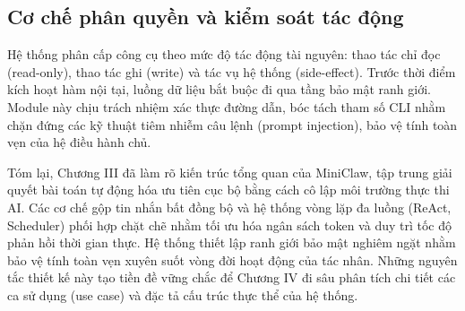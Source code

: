 \subsection{Cơ chế phân quyền và kiểm soát tác động}
Hệ thống phân cấp công cụ theo mức độ tác động tài nguyên: thao tác chỉ đọc (read-only), thao tác ghi (write) và tác vụ hệ thống (side-effect). Trước thời điểm kích hoạt hàm nội tại, luồng dữ liệu bắt buộc đi qua tầng bảo mật ranh giới. Module này chịu trách nhiệm xác thực đường dẫn, bóc tách tham số CLI nhằm chặn đứng các kỹ thuật tiêm nhiễm câu lệnh (prompt injection), bảo vệ tính toàn vẹn của hệ điều hành chủ.

Tóm lại, Chương III đã làm rõ kiến trúc tổng quan của MiniClaw, tập trung giải quyết bài toán tự động hóa ưu tiên cục bộ bằng cách cô lập môi trường thực thi AI. Các cơ chế gộp tin nhắn bất đồng bộ và hệ thống vòng lặp đa luồng (ReAct, Scheduler) phối hợp chặt chẽ nhằm tối ưu hóa ngân sách token và duy trì tốc độ phản hồi thời gian thực. Hệ thống thiết lập ranh giới bảo mật nghiêm ngặt nhằm bảo vệ tính toàn vẹn xuyên suốt vòng đời hoạt động của tác nhân. Những nguyên tắc thiết kế này tạo tiền đề vững chắc để Chương IV đi sâu phân tích chi tiết các ca sử dụng (use case) và đặc tả cấu trúc thực thể của hệ thống.
